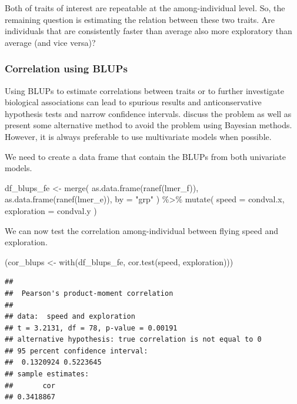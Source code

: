 \documentclass[
  12pt,
]{book}
\newenvironment{Shaded}{\begin{snugshade}}{\end{snugshade}}
\newcommand{\AttributeTok}[1]{\textcolor[rgb]{0.77,0.63,0.00}{#1}}
\newcommand{\FunctionTok}[1]{\textcolor[rgb]{0.00,0.00,0.00}{#1}}
\newcommand{\NormalTok}[1]{#1}
\newcommand{\OtherTok}[1]{\textcolor[rgb]{0.56,0.35,0.01}{#1}}
\newcommand{\SpecialCharTok}[1]{\textcolor[rgb]{0.00,0.00,0.00}{#1}}
\newcommand{\StringTok}[1]{\textcolor[rgb]{0.31,0.60,0.02}{#1}}
\begin{document}
Both of traits of interest are repeatable at the among-individual level. So, the remaining question is estimating the relation between these two traits. Are individuals that are consistently faster than average also more exploratory than average (and vice versa)?

\hypertarget{correlation-using-blups}{%
\subsubsection{Correlation using BLUPs}\label{correlation-using-blups}}

Using BLUPs to estimate correlations between traits or to further investigate biological associations can lead to spurious results and anticonservative hypothesis tests and narrow confidence intervals. \citet{hadfield_misuse_2010} discuss the problem as well as present some alternative method to avoid the problem using Bayesian methods. However, it is always preferable to use multivariate models when possible.

We need to create a data frame that contain the BLUPs from both univariate models.

\begin{Shaded}
\begin{Highlighting}[]
\NormalTok{df\_blups\_fe }\OtherTok{\textless{}{-}} \FunctionTok{merge}\NormalTok{(}
  \FunctionTok{as.data.frame}\NormalTok{(}\FunctionTok{ranef}\NormalTok{(lmer\_f)),}
  \FunctionTok{as.data.frame}\NormalTok{(}\FunctionTok{ranef}\NormalTok{(lmer\_e)),}
  \AttributeTok{by =} \StringTok{"grp"}
\NormalTok{) }\SpecialCharTok{\%\textgreater{}\%}
  \FunctionTok{mutate}\NormalTok{(}
    \AttributeTok{speed =}\NormalTok{ condval.x,}
    \AttributeTok{exploration =}\NormalTok{ condval.y}
\NormalTok{  )}
\end{Highlighting}
\end{Shaded}

We can now test the correlation among-individual between flying speed and exploration.

\begin{Shaded}
\begin{Highlighting}[]
\NormalTok{(cor\_blups }\OtherTok{\textless{}{-}} \FunctionTok{with}\NormalTok{(df\_blups\_fe, }\FunctionTok{cor.test}\NormalTok{(speed, exploration)))}
\end{Highlighting}
\end{Shaded}

\begin{verbatim}
## 
##  Pearson's product-moment correlation
## 
## data:  speed and exploration
## t = 3.2131, df = 78, p-value = 0.00191
## alternative hypothesis: true correlation is not equal to 0
## 95 percent confidence interval:
##  0.1320924 0.5223645
## sample estimates:
##       cor 
## 0.3418867
\end{verbatim}
\end{document}
